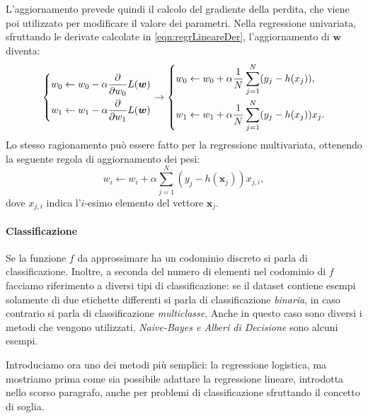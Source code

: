 \documentclass[../../main.tex]{subfiles}
\begin{document}
    L'aggiornamento prevede quindi il calcolo del gradiente della perdita, che viene poi utilizzato per modificare il valore dei parametri. Nella regressione univariata, sfruttando le derivate calcolate in \eqref{eqn:regrLineareDer}, l'aggiornamento di $\boldsymbol{w}$ diventa:
    \[
        \begin{dcases}
            w_0 \leftarrow w_0 - \alpha \frac{\partial}{\partial w_0} L(\boldsymbol{w})\\
            w_1 \leftarrow w_1- \alpha \frac{\partial}{\partial w_1} L(\boldsymbol{w})
        \end{dcases}
        \rightarrow
        \begin{dcases}
            w_0 \leftarrow w_0 + \alpha \frac{1}{N} \sum_{j=1}^N (y_j - h(x_j)),\\
            w_1 \leftarrow w_1 + \alpha \frac{1}{N} \sum_{j=1}^N (y_j - h(x_j))x_j.
        \end{dcases}
    \]
    Lo stesso ragionamento può essere fatto per la regressione multivariata, ottenendo la seguente regola di aggiornamento dei pesi:
    \[w_i \leftarrow w_i + \alpha \sum_{j=1}^N(y_j - h(\boldsymbol{x}_j))x_{j,i},\]
    dove $x_{j,i}$ indica l'$i$-esimo elemento del vettore $\boldsymbol{x}_j$.

    \paragraph{Classificazione} Se la funzione $f$ da approssimare ha un codominio discreto si parla di classificazione. Inoltre, a seconda del numero di elementi nel codominio di $f$ facciamo riferimento a diversi tipi di classificazione: se il dataset contiene esempi solamente di due etichette differenti si parla di classificazione \textit{binaria}, in caso contrario si parla di classificazione \textit{multiclasse}. Anche in questo caso sono diversi i metodi che vengono utilizzati, \textit{Naive-Bayes e Alberi di Decisione} sono alcuni esempi.
    
    Introduciamo ora uno dei metodi più semplici: la regressione logistica, ma mostriamo prima come sia possibile adattare la regressione lineare, introdotta nello scorso paragrafo, anche per problemi di classificazione sfruttando il concetto di soglia.
\end{document}
